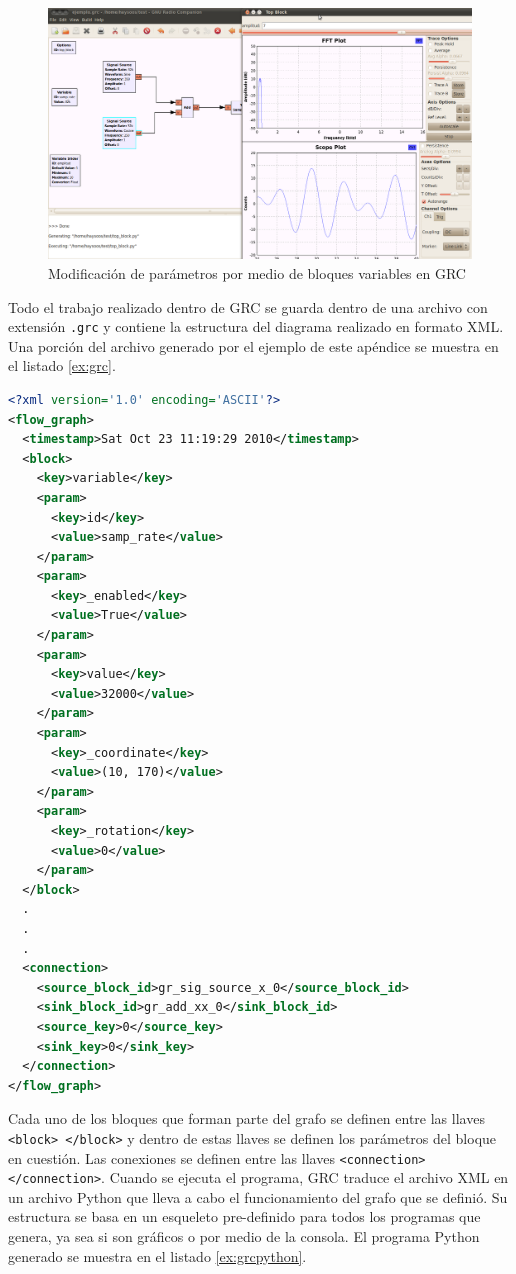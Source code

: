 \begin{figure}[htp]
  \centering
  \includegraphics[width=5.5in]{figs/grc9}
  \vspace{0.1in}
  \caption{Modificaci\'on de par\'ametros por medio de bloques variables en GRC}
  \label{fig:vargrc}
\end{figure}

Todo el trabajo realizado dentro de GRC se guarda dentro de una archivo con extensi\'on \verb|.grc| y contiene la estructura del
diagrama realizado en formato XML. Una porci\'on del archivo generado por el ejemplo de este ap\'endice se muestra en el listado
\ref{ex:grc}.

\begin{lstlisting}[float, language=XML, label=ex:grc, caption={C\'odigo XML del archivo de un proyecto de GRC}]
<?xml version='1.0' encoding='ASCII'?>
<flow_graph>
  <timestamp>Sat Oct 23 11:19:29 2010</timestamp>
  <block>
    <key>variable</key>
    <param>
      <key>id</key>
      <value>samp_rate</value>
    </param>
    <param>
      <key>_enabled</key>
      <value>True</value>
    </param>
    <param>
      <key>value</key>
      <value>32000</value>
    </param>
    <param>
      <key>_coordinate</key>
      <value>(10, 170)</value>
    </param>
    <param>
      <key>_rotation</key>
      <value>0</value>
    </param>
  </block>
  .
  .
  .
  <connection>
    <source_block_id>gr_sig_source_x_0</source_block_id>
    <sink_block_id>gr_add_xx_0</sink_block_id>
    <source_key>0</source_key>
    <sink_key>0</sink_key>
  </connection>
</flow_graph>
\end{lstlisting}

Cada uno de los bloques que forman parte del grafo se definen entre las llaves \verb|<block> </block>| y dentro de estas llaves se
definen los par\'ametros del bloque en cuesti\'on. Las conexiones se definen entre las llaves \verb|<connection> </connection>|.
Cuando se ejecuta el programa, GRC traduce el archivo XML en un archivo Python que lleva a cabo el funcionamiento del grafo que se
defini\'o. Su estructura se basa en un esqueleto pre-definido para todos los programas que genera, ya sea si son gr\'aficos o por
medio de la consola. El programa Python generado se muestra en el listado \ref{ex:grcpython}.

